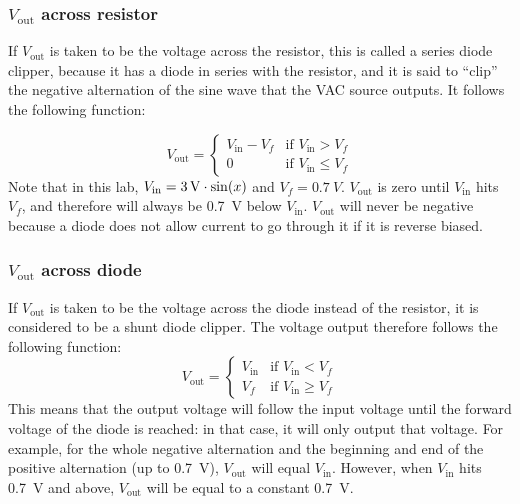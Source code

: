 \documentclass{article}
\begin{document}
\subsubsection{\(V_\text{out}\) across resistor} 
If \(V_\text{out}\) is taken to be the voltage across the resistor,
this is called a series diode clipper, because it has a diode
in series with the resistor, and it is said to ``clip'' the
negative alternation of the sine wave that the VAC
source outputs. It follows the following function:

\begin{equation}
    V_\text{out}=
    \begin{cases}
        V_\text{in} - V_f & \text{if $V_\text{in} > V_f$}\\
        0 & \text{if $V_\text{in}\le V_f$}
    \end{cases}
\end{equation} Note that in this lab, \(V_\text{in} = \SI3{V} \cdot \sin(x)\)
and \(V_f = \SI{0.7}{V}\).
\(V_\text{out}\) is zero until \(V_\text{in}\) hits \(V_f\),
and therefore will always be
\SI{0.7}{V} below \(V_\text{in}\). \(V_\text{out}\) will never
be negative because a diode does not allow current
to go through it if it is reverse biased.

\subsubsection{\(V_\text{out}\) across diode} If \(V_\text{out}\)
is taken to be the voltage across the diode instead of the
resistor, it is considered to be a shunt diode clipper. The
voltage output therefore follows the following function:
\begin{equation}
    V_\text{out} = 
    \begin{cases}
        V_\text{in} & \text{if $V_\text{in} < V_f$}\\
        V_f         & \text{if $V_\text{in} \ge V_f$}
    \end{cases}
\end{equation} This means that the output voltage will follow
the input voltage until the forward voltage of the diode is
reached: in that case, it will only output that voltage.
For example, for the whole negative alternation and the
beginning and end of the positive alternation
(up to \SI{0.7}{V}), \(V_\text{out}\) will equal \(V_\text{in}\).
However, when \(V_\text{in}\) hits \SI{0.7}{V} and above,
\(V_\text{out}\) will be equal to a constant \SI{0.7}{V}.
\end{document}
